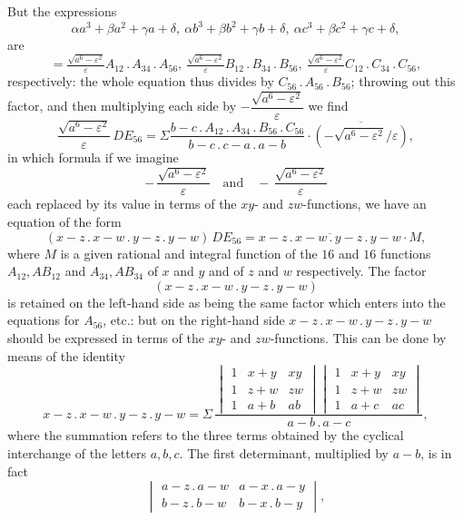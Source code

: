 \documentclass[11pt]{article}
\begin{document}
But the expressions
\[
\alpha a^3 + \beta a^2 + \gamma a + \delta,\ \alpha b^3 + \beta b^2 + \gamma b + \delta,\ \alpha c^3 + \beta c^2 + \gamma c + \delta,
\]
are
\[
= \tfrac{\sqrt{a^6 - \varepsilon^2}}{\varepsilon}A_{12}\mathbin{.}A_{34}\mathbin{.}A_{56},\ \tfrac{\sqrt{a^6 - \varepsilon^2}}{\varepsilon}B_{12}\mathbin{.}B_{34}\mathbin{.}B_{56},\ \tfrac{\sqrt{a^6 - \varepsilon^2}}{\varepsilon}C_{12}\mathbin{.}C_{34}\mathbin{.}C_{56},
\]
respectively: the whole equation thus divides by $C_{56}\mathbin{.}A_{56}\mathbin{.}B_{56}$; throwing out this factor, and then multiplying each side by $-\dfrac{\sqrt{a^6 - \varepsilon^2}}{\varepsilon}$ we find
\[
\frac{\sqrt{a^6 - \varepsilon^2}}{\varepsilon}\, DE_{56} = \Sigma\frac{b-c\mathbin{.}A_{12}\mathbin{.}A_{34}\mathbin{.}B_{56}\mathbin{.}C_{56}}{b-c\mathbin{.}c-a\mathbin{.}a-b}\cdot\overline{(-\sqrt{a^6 - \varepsilon^2}/\varepsilon)},
\]
in which formula if we imagine
\[
-\,\dfrac{\sqrt{a^6 - \varepsilon^2}}{\varepsilon}\quad\text{and}\quad -\,\dfrac{\sqrt{a^6 - \varepsilon^2}}{\varepsilon}
\]
each replaced by its value in terms of the $xy$- and $zw$-functions, we have an equation of the form
\[
(x-z\mathbin{.}x-w\mathbin{.}y-z\mathbin{.}y-w)\, DE_{56} = \overline{x-z\mathbin{.}x-w\mathbin{.}y-z\mathbin{.}y-w}\cdot M,
\]
where $M$ is a given rational and integral function of the $16$ and $16$ functions $A_{12},AB_{12}$ and $A_{34},AB_{34}$ of $x$ and $y$ and of $z$ and $w$ respectively. The factor
\[
(x-z\mathbin{.}x-w\mathbin{.}y-z\mathbin{.}y-w)
\]
is retained on the left-hand side as being the same factor which enters into the equations for $A_{56}$, etc.: but on the right-hand side $x-z\mathbin{.}x-w\mathbin{.}y-z\mathbin{.}y-w$ should be expressed in terms of the $xy$- and $zw$-functions. This can be done by means of the identity
\[
x-z\mathbin{.}x-w\mathbin{.}y-z\mathbin{.}y-w = \Sigma\,\frac{\begin{vmatrix} 1 & x+y & xy \\ 1 & z+w & zw \\ 1 & a+b & ab \end{vmatrix}\begin{vmatrix} 1 & x+y & xy \\ 1 & z+w & zw \\ 1 & a+c & ac \end{vmatrix}}{a-b\mathbin{.}a-c},
\]
where the summation refers to the three terms obtained by the cyclical interchange of the letters $a,b,c$. The first determinant, multiplied by $a-b$, is in fact
\[
\begin{vmatrix} a-z\mathbin{.}a-w & a-x\mathbin{.}a-y \\ b-z\mathbin{.}b-w & b-x\mathbin{.}b-y \end{vmatrix},
\]
\end{document}
